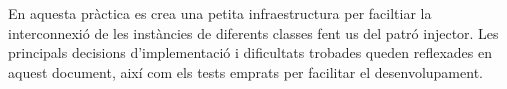 
En aquesta pràctica es crea una petita infraestructura 
per faciltiar la interconnexió de les instàncies de 
diferents classes fent us del patró injector. Les 
principals decisions d'implementació i dificultats 
trobades queden reflexades en aquest document, així
com els tests emprats per facilitar el desenvolupament. 







